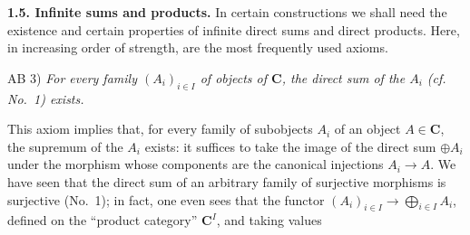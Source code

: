 \noindent\textbf{1.5. Infinite sums and products.}
In certain constructions we shall need the existence and certain properties
of infinite direct sums and direct products. Here, in increasing order of
strength, are the most frequently used axioms.

\noindent AB 3) \textit{For every family $(A_i)_{i\in I}$ of objects
of $\mathbf{C}$, the direct sum of the $A_i$ (cf. No.~1) exists.}

This axiom implies that, for every family of subobjects $A_i$ of an object
$A\in\mathbf{C}$, the supremum of the $A_i$ exists: it suffices to take the image of
the direct sum $\oplus A_i$ under the morphism whose components are
the canonical injections $A_i\to A$. We have seen that the direct
sum of an arbitrary family of surjective morphisms is surjective (No.~1); in
fact, one even sees that the functor $(A_i)_{i\in I}\to\displaystyle\bigoplus_{i\in I}A_i$, defined on the ``product category'' $\mathbf{C}^I$, and taking values

